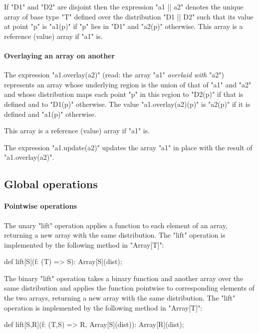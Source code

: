 If \xcd"D1" and \xcd"D2" are disjoint then the expression \xcd"a1 || a2" denotes the unique array of base type \xcd"T" defined over the
distribution \xcd"D1 || D2" such that its value at point \xcd"p" is
\xcd"a1(p)" if \xcd"p" lies in \xcd"D1" and \xcd"a2(p)"
otherwise. This array is a reference (value) array if \xcd"a1" is.

\paragraph{Overlaying an array on another}
The expression
\xcd"a1.overlay(a2)" (read: the array \xcd"a1" {\em overlaid with} \xcd"a2")
represents an array whose underlying region is the union of that of
\xcd"a1" and \xcd"a2" and whose distribution maps each point \xcd"p"
in this region to \xcd"D2(p)" if that is defined and to \xcd"D1(p)"
otherwise. The value \xcd"a1.overlay(a2)(p)" is \xcd"a2(p)" if it is defined and \xcd"a1(p)" otherwise.

This array is a reference (value) array if \xcd"a1" is.

The expression \xcd"a1.update(a2)" updates the array \xcd"a1" in place
with the result of \xcd"a1.overlay(a2)".




\subsection{Global operations }

\paragraph{Pointwise operations}\label{ArrayPointwise}
The unary \xcd"lift" operation applies a function to each element of
an array, returning a new array with the same distribution.
The \xcd"lift" operation is implemented by the following method
in \xcd"Array[T]":
\begin{xten}
def lift[S](f: (T) => S): Array[S](dist);
\end{xten}

The binary \xcd"lift" operation takes a binary function and
another
array over the same distribution and applies the function
pointwise to corresponding elements of the two arrays, returning
a new array with the same distribution.
The \xcd"lift" operation is implemented by the following method
in \xcd"Array[T]":
\begin{xten}
def lift[S,R](f: (T,S) => R, Array[S](dist)): Array[R](dist);
\end{xten}

